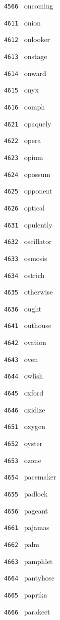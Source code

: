 \documentclass[11pt]{article}
\begin{document}
\begin{multicols}{6}
\noindent \texttt{ 4566 } oncoming  \par
\noindent \texttt{ 4611 } onion  \par
\noindent \texttt{ 4612 } onlooker  \par
\noindent \texttt{ 4613 } onstage  \par
\noindent \texttt{ 4614 } onward  \par
\noindent \texttt{ 4615 } onyx  \par
\noindent \texttt{ 4616 } oomph  \par
\vspace{3mm}
\noindent \texttt{ 4621 } opaquely  \par
\noindent \texttt{ 4622 } opera  \par
\noindent \texttt{ 4623 } opium  \par
\noindent \texttt{ 4624 } opossum  \par
\noindent \texttt{ 4625 } opponent  \par
\noindent \texttt{ 4626 } optical  \par
\vspace{3mm}
\noindent \texttt{ 4631 } opulently  \par
\noindent \texttt{ 4632 } oscillator  \par
\noindent \texttt{ 4633 } osmosis  \par
\noindent \texttt{ 4634 } ostrich  \par
\noindent \texttt{ 4635 } otherwise  \par
\noindent \texttt{ 4636 } ought  \par
\vspace{3mm}
\noindent \texttt{ 4641 } outhouse  \par
\noindent \texttt{ 4642 } ovation  \par
\noindent \texttt{ 4643 } oven  \par
\noindent \texttt{ 4644 } owlish  \par
\noindent \texttt{ 4645 } oxford  \par
\noindent \texttt{ 4646 } oxidize  \par
\vspace{3mm}
\noindent \texttt{ 4651 } oxygen  \par
\noindent \texttt{ 4652 } oyster  \par
\noindent \texttt{ 4653 } ozone  \par
\noindent \texttt{ 4654 } pacemaker  \par
\noindent \texttt{ 4655 } padlock  \par
\noindent \texttt{ 4656 } pageant  \par
\vspace{3mm}
\noindent \texttt{ 4661 } pajamas  \par
\noindent \texttt{ 4662 } palm  \par
\noindent \texttt{ 4663 } pamphlet  \par
\noindent \texttt{ 4664 } pantyhose  \par
\noindent \texttt{ 4665 } paprika  \par
\noindent \texttt{ 4666 } parakeet  \par
\end{multicols}
\end{document}
